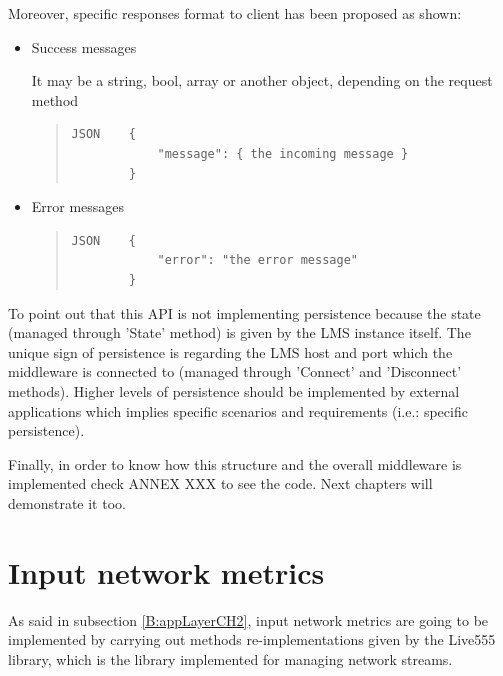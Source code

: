 Moreover, specific responses format to client has been proposed as shown:

\begin{itemize}
\item Success messages \hfill

It may be a string, bool, array or another object, depending on the request method

\begin{quote}
\begin{verbatim}
JSON    {
            "message": { the incoming message }
        }
\end{verbatim}
\end{quote}        
\item Error messages \hfill

\begin{quote}
\begin{verbatim}
JSON    {
            "error": "the error message"
        }
\end{verbatim}
\end{quote}
\end{itemize}

To point out that this API is not implementing persistence because the state (managed through 'State' method) is given by the LMS instance itself. The unique sign of persistence is regarding the LMS host and port which the middleware is connected to (managed through 'Connect' and 'Disconnect' methods). Higher levels of persistence should be implemented by external applications which implies specific scenarios and requirements (i.e.: specific persistence).

Finally, in order to know how this structure and the overall middleware is implemented check ANNEX XXX to see the code. Next chapters will demonstrate it too.

\section{Input network metrics}

As said in subsection \ref{B:appLayerCH2}, input network metrics are going to be implemented by carrying out methods re-implementations given by the Live555 library, which is the library implemented for managing network streams.  

